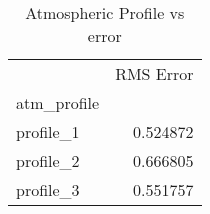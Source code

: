\begin{table}
\caption{Atmospheric Profile vs error}
\begin{tabular}{lr}
 & RMS Error \\
atm_profile &  \\
profile_1 & 0.524872 \\
profile_2 & 0.666805 \\
profile_3 & 0.551757 \\
\end{tabular}
\end{table}
